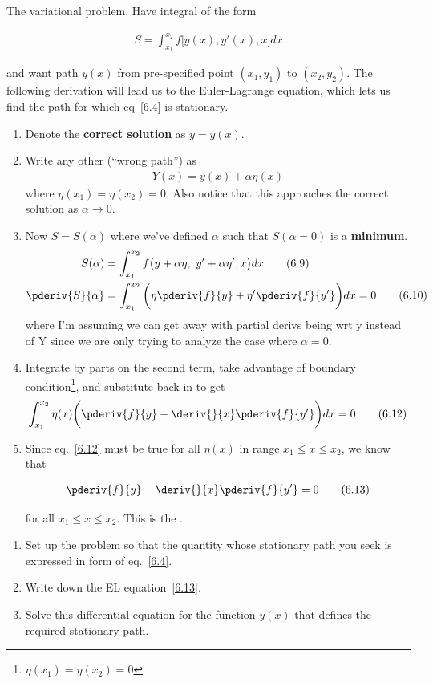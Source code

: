 \documentclass[10pt, twocolumn]{article}
\DeclareRobustCommand{\mybox}[2][gray!20]{%
	\begin{tcolorbox}[   %
		breakable,
		left=0pt,
		right=0pt,
		top=-13pt,
		bottom=0pt,
		colback=#1,
		colframe=#1,
		width=0.45\dimexpr\textwidth\relax,
		enlarge left by=0mm,
		boxsep=1pt,
		arc=0pt,outer arc=0pt,
		]
		#2
	\end{tcolorbox}
}
\newcommand\graybox[1]{ \mybox[gray!20]{\begin{align}#1\end{align}} }
\newcommand{\myspace}{\vspace{3\bigskipamount}}
\newcommand\p{\Needspace{10\baselineskip} \noindent}
\newcommand\tlab[1]{\tag{#1}\label{#1}}
\begin{document}
\p The variational problem. Have integral of the form \graybox{
	S = \int_{x_1}^{x_2} f\big[	y(x), y'(x), x \big] dx \tlab{6.4}
	}
\p and want path $y(x)$ from pre-specified point $(x_1, y_1)$ to $(x_2, y_2)$. The following derivation will lead us to the Euler-Lagrange equation, which lets us find the path for which eq~\ref{6.4} is stationary. 
\begin{enumerate}
	\item Denote the \textbf{correct solution} as $y = y(x)$. 
	
	\item Write any other (``wrong path'') as 
	\begin{align}
		Y(x) = y(x) + \alpha \eta(x) \tlab{6.8} 
	\end{align}
	where $\eta(x_1) = \eta(x_2) = 0$. Also notice that this approaches the correct solution as $\alpha \rightarrow 0$. 
	
	\item Now $S = S(\alpha)$ where we've defined $\alpha$ such that $S(\alpha = 0)$ is a \textbf{minimum}. 
	\begin{align}
		S(\alpha) &= \int_{x_1}^{x_2} f\big(y + \alpha \eta,~ y' + \alpha \eta', x\big) dx \tlab{6.9}\\
		\pderiv{S}{\alpha} &= \int_{x_1}^{x_2} \bigg( \eta \pderiv{f}{y} + \eta' \pderiv{f}{y'} \bigg) dx = 0 \tlab{6.10}
	\end{align}
	where I'm assuming we can get away with partial derivs being wrt y instead of Y since we are only trying to analyze the case where $\alpha = 0$. 
	
	\item Integrate by parts on the second term, take advantage of boundary condition\footnote{$\eta(x_1) = \eta(x_2) = 0$}, and substitute back in to get
	\begin{align}
		\int_{x_1}^{x_2}  \eta(x) \bigg( \pderiv{f}{y} - \deriv{}{x} \pderiv{f}{y'} \bigg) dx = 0 \tlab{6.12}
	\end{align}
	
	\item Since eq.~\ref{6.12} must be true for all $\eta(x)$ in range $x_1 \le x \le x_2$, we know that \graybox{
		\pderiv{f}{y} - \deriv{}{x} \pderiv{f}{y'}  = 0 \tlab{6.13}
	}
	for all $x_1 \le x \le x_2$. This is the . 
\end{enumerate}

\myspace
\p {}
\begin{enumerate}
	\item Set up the problem so that the quantity whose stationary path you seek is expressed in form of eq.~\ref{6.4}. 
	
	\item Write down the EL equation~\ref{6.13}. 
	
	\item Solve this differential equation for the function $y(x)$ that defines the required stationary path. 
\end{enumerate}
\end{document}
